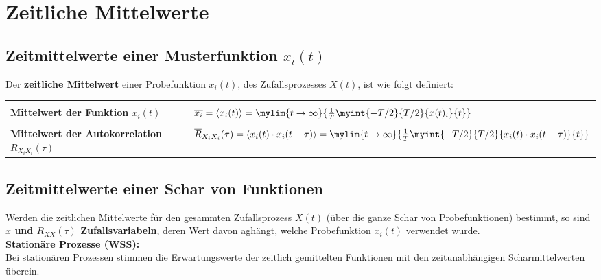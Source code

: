 		\section{Zeitliche Mittelwerte}
			\subsection{Zeitmittelwerte einer Musterfunktion $x_i(t)$}
				Der \textbf{zeitliche Mittelwert} einer Probefunktion $x_i(t)$, des Zufallsprozesses $X(t)$, ist wie folgt definiert:\\[0.2cm]
				\begin{tabular}{|l|l|}
				\hline&\\[-0.35cm]
					\textbf{Mittelwert der Funktion $x_i(t)$} & $\overline {x_i} = \langle x_i(t)\rangle = \mylim{t\to\infty}{\frac{1}{T}\myint{-T/2}{T/2}{x(t)_i}{t}}$\\[0.35cm]
				\hline&\\[-0.35cm]
					\textbf{Mittelwert der Autokorrelation $R_{X_iX_i}(\tau)$} & $\overline{R}_{X_iX_i}(\tau) = \langle x_i(t)\cdot x_i(t+\tau)\rangle = \mylim{t\to\infty}{\frac{1}{T}\myint{-T/2}{T/2}{x_i(t)\cdot x_i(t+\tau)}{t}}$\\[0.35cm]
				\hline
				\end{tabular}
\newpage
			\subsection{Zeitmittelwerte einer Schar von Funktionen}
				Werden die zeitlichen Mittelwerte für den gesammten Zufallsprozess $X(t)$ (über die ganze Schar von Probefunktionen) bestimmt, so sind \textbf{$\overline{x}$ und $\overline{R}_{XX}(\tau)$ Zufallsvariabeln}, deren Wert davon aghängt, welche Probefunktion $x_i(t)$ verwendet wurde.\\[0.2cm]
				\textbf{Stationäre Prozesse (WSS):}\\[0.2cm]
				Bei stationären Prozessen stimmen die Erwartungswerte der zeitlich gemittelten Funktionen mit den zeitunabhängigen Scharmittelwerten überein.\\[0.2cm]

